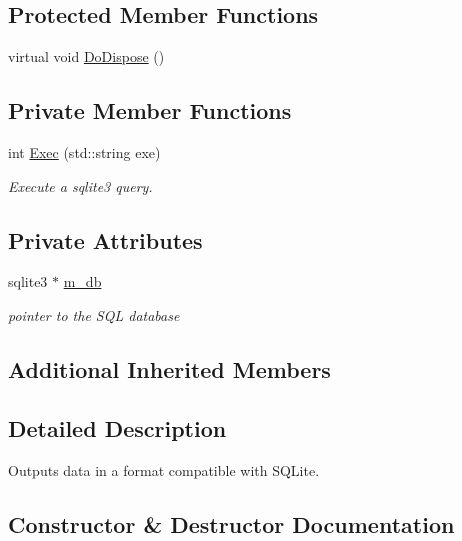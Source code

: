 \subsection*{Protected Member Functions}
\begin{DoxyCompactItemize}
\item 
virtual void \hyperlink{classns3_1_1SqliteDataOutput_a0e58252b0a3a3f8f6aebbd8d41b89561}{Do\+Dispose} ()
\end{DoxyCompactItemize}
\subsection*{Private Member Functions}
\begin{DoxyCompactItemize}
\item 
int \hyperlink{classns3_1_1SqliteDataOutput_a73206b50a726ca299f6347e35bb2dcc1}{Exec} (std\+::string exe)
\begin{DoxyCompactList}\small\item\em Execute a sqlite3 query. \end{DoxyCompactList}\end{DoxyCompactItemize}
\subsection*{Private Attributes}
\begin{DoxyCompactItemize}
\item 
sqlite3 $\ast$ \hyperlink{classns3_1_1SqliteDataOutput_a6d9dcae5a1595e93e79a8ec365e3bbc9}{m\+\_\+db}
\begin{DoxyCompactList}\small\item\em pointer to the S\+QL database \end{DoxyCompactList}\end{DoxyCompactItemize}
\subsection*{Additional Inherited Members}


\subsection{Detailed Description}
Outputs data in a format compatible with S\+Q\+Lite. 

\subsection{Constructor \& Destructor Documentation}
